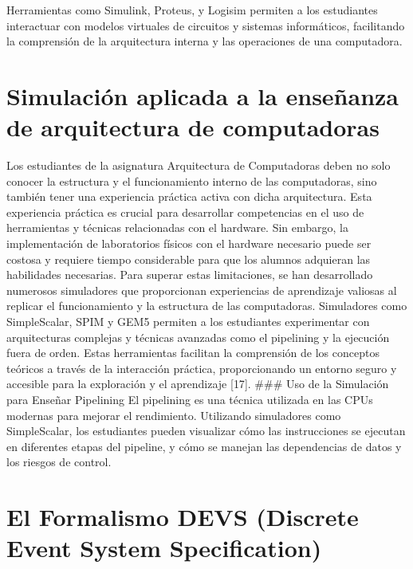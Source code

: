\documentclass[12pt,twoside]{templates/unerthesis}
\begin{document}
Herramientas como Simulink, Proteus, y Logisim permiten a los estudiantes interactuar con modelos virtuales de circuitos y sistemas informáticos, facilitando la comprensión de la arquitectura interna y las operaciones de una computadora.

\hypertarget{simulaciuxf3n-aplicada-a-la-enseuxf1anza-de-arquitectura-de-computadoras}{%
\section{Simulación aplicada a la enseñanza de arquitectura de computadoras}\label{simulaciuxf3n-aplicada-a-la-enseuxf1anza-de-arquitectura-de-computadoras}}

Los estudiantes de la asignatura Arquitectura de Computadoras deben no solo conocer la estructura y el funcionamiento interno de las computadoras, sino también tener una experiencia práctica activa con dicha arquitectura. Esta experiencia práctica es crucial para desarrollar competencias en el uso de herramientas y técnicas relacionadas con el hardware. Sin embargo, la implementación de laboratorios físicos con el hardware necesario puede ser costosa y requiere tiempo considerable para que los alumnos adquieran las habilidades necesarias.
Para superar estas limitaciones, se han desarrollado numerosos simuladores que proporcionan experiencias de aprendizaje valiosas al replicar el funcionamiento y la estructura de las computadoras. Simuladores como SimpleScalar, SPIM y GEM5 permiten a los estudiantes experimentar con arquitecturas complejas y técnicas avanzadas como el pipelining y la ejecución fuera de orden. Estas herramientas facilitan la comprensión de los conceptos teóricos a través de la interacción práctica, proporcionando un entorno seguro y accesible para la exploración y el aprendizaje {[}17{]}.
\#\#\# Uso de la Simulación para Enseñar Pipelining
El pipelining es una técnica utilizada en las CPUs modernas para mejorar el rendimiento. Utilizando simuladores como SimpleScalar, los estudiantes pueden visualizar cómo las instrucciones se ejecutan en diferentes etapas del pipeline, y cómo se manejan las dependencias de datos y los riesgos de control.

\hypertarget{el-formalismo-devs-discrete-event-system-specification}{%
\section{El Formalismo DEVS (Discrete Event System Specification)}\label{el-formalismo-devs-discrete-event-system-specification}}
\end{document}
